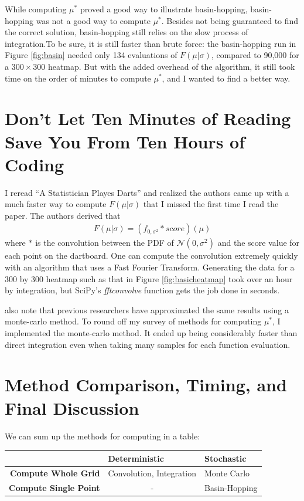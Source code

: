 \documentclass[]{article}
\newcommand{\mustar}{\ensuremath{\mu^* }}
\begin{document}
While computing $\mu^*$ proved a good way to illustrate basin-hopping, basin-hopping was not a good way to compute $\mu^*$. Besides not being guaranteed to find the correct solution, basin-hopping still relies on the slow process of integration.To be sure, it is still faster than brute force: the basin-hopping run in Figure \ref{fig:basin} needed only 134 evaluations of $F(\mu \vert \sigma)$, compared to 90,000 for a $300 \times 300$ heatmap. But with the added overhead of the algorithm, it still took time on the order of minutes to compute $\mu^*$, and I wanted to find a better way.

\section{Don't Let Ten Minutes of Reading Save You From Ten Hours of Coding}
I reread ``A Statistician Playes Darts''\cite{stat} and realized the authors came up with a much faster way to compute $F(\mu \vert \sigma)$ that I missed the first time I read the paper. The authors derived that
\begin{align}
	F(\mu \vert \sigma)  =(f_{0, \sigma^2} * score)(\mu)
\end{align}
 where $*$ is the convolution between the PDF of $\mathcal{N}(0, \sigma^2)$ and the score value for each point on the dartboard\cite{stat}. One can compute the convolution extremely quickly with an algorithm that uses a Fast Fourier Transform. Generating the data for a 300 by 300 heatmap such as that in Figure \ref{fig:basicheatmap} took over an hour by integration, but SciPy's \textit{fftconvolve} function gets the job done in seconds. 

\citeauthor{stat} also note that previous researchers have approximated the same results using a monte-carlo method\cite{stat}. To round off my  survey of methods for computing \mustar, I implemented the monte-carlo method. It ended up being considerably faster than direct integration even when taking many samples for each function evaluation. 

\section{Method Comparison, Timing, and Final Discussion}\label{sec:timing}

We can sum up the methods for computing in a table:

\begin{table}[h]
	\centering
	\begin{tabular}{r  l l}
		& \textbf{Deterministic} & \textbf{Stochastic} \\ \hline
		\textbf{Compute Whole Grid} \vline& Convolution, Integration & Monte Carlo \\
		\textbf{Compute Single Point} \vline& \multicolumn{1}{c}{-} & Basin-Hopping
	\end{tabular}
\end{table}
\end{document}
